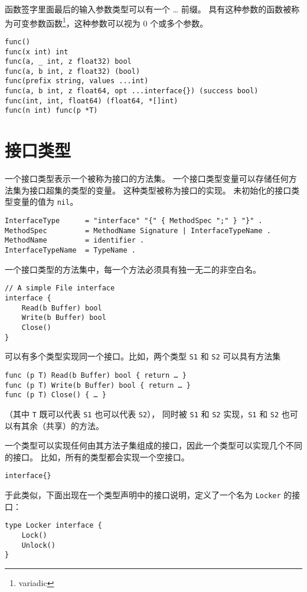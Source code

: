 函数签字里面最后的输入参数类型可以有一个 \dots{} 前缀。
具有这种参数的函数被称为可变参数函数\footnote{variadic}，这种参数可以视为 0 个或多个参数。
\begin{lstlisting}[style=golang]
func()
func(x int) int
func(a, _ int, z float32) bool
func(a, b int, z float32) (bool)
func(prefix string, values ...int)
func(a, b int, z float64, opt ...interface{}) (success bool)
func(int, int, float64) (float64, *[]int)
func(n int) func(p *T)
\end{lstlisting}


\section{接口类型} \label{sec:interface types}
一个接口类型表示一个被称为接口的方法集。
一个接口类型变量可以存储任何方法集为接口超集的类型的变量。
这种类型被称为接口的实现。
未初始化的接口类型变量的值为 \lstinline|nil|。
\begin{lstlisting}[style=EBNF]
InterfaceType      = "interface" "{" { MethodSpec ";" } "}" .
MethodSpec         = MethodName Signature | InterfaceTypeName .
MethodName         = identifier .
InterfaceTypeName  = TypeName .
\end{lstlisting}

一个接口类型的方法集中，每一个方法必须具有独一无二的非空白名。
\begin{lstlisting}[style=golang]
// A simple File interface
interface {
	Read(b Buffer) bool
	Write(b Buffer) bool
	Close()
}
\end{lstlisting}

可以有多个类型实现同一个接口。比如，两个类型 \lstinline|S1| 和 \lstinline|S2| 可以具有方法集
\begin{lstlisting}[style=golang]
func (p T) Read(b Buffer) bool { return … }
func (p T) Write(b Buffer) bool { return … }
func (p T) Close() { … }
\end{lstlisting}

（其中 \lstinline|T| 既可以代表 \lstinline|S1| 也可以代表 \lstinline|S2|），
同时被 \lstinline|S1| 和 \lstinline|S2| 实现，\lstinline|S1| 和 \lstinline|S2| 也可以有其余（共享）的方法。

一个类型可以实现任何由其方法子集组成的接口，因此一个类型可以实现几个不同的接口。
比如，所有的类型都会实现一个空接口。
\begin{lstlisting}[style=golang]
interface{}
\end{lstlisting}

于此类似，下面出现在一个类型声明中的接口说明，定义了一个名为 \lstinline|Locker| 的接口：
\begin{lstlisting}[style=golang]
type Locker interface {
	Lock()
	Unlock()
}
\end{lstlisting}


